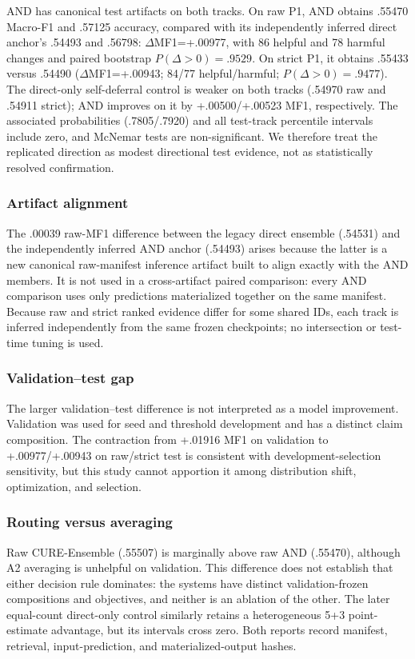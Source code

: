 \documentclass[11pt]{article}
\begin{document}
AND has canonical test artifacts on both tracks. On raw P1, AND obtains .55470 Macro-F1 and .57125 accuracy, compared with its independently inferred direct anchor's .54493 and .56798: $\Delta$MF1=+.00977, with 86 helpful and 78 harmful changes and paired bootstrap $P(\Delta>0)=.9529$. On strict P1, it obtains .55433 versus .54490 ($\Delta$MF1=+.00943; 84/77 helpful/harmful; $P(\Delta>0)=.9477$). The direct-only self-deferral control is weaker on both tracks (.54970 raw and .54911 strict); AND improves on it by +.00500/+.00523 MF1, respectively. The associated probabilities (.7805/.7920) and all test-track percentile intervals include zero, and McNemar tests are non-significant. We therefore treat the replicated direction as modest directional test evidence, not as statistically resolved confirmation.

\subsubsection{Artifact alignment}
The .00039 raw-MF1 difference between the legacy direct ensemble (.54531) and the independently inferred AND anchor (.54493) arises because the latter is a new canonical raw-manifest inference artifact built to align exactly with the AND members. It is not used in a cross-artifact paired comparison: every AND comparison uses only predictions materialized together on the same manifest. Because raw and strict ranked evidence differ for some shared IDs, each track is inferred independently from the same frozen checkpoints; no intersection or test-time tuning is used.

\subsubsection{Validation--test gap}
The larger validation--test difference is not interpreted as a model improvement. Validation was used for seed and threshold development and has a distinct claim composition. The contraction from +.01916 MF1 on validation to +.00977/+.00943 on raw/strict test is consistent with development-selection sensitivity, but this study cannot apportion it among distribution shift, optimization, and selection.

\subsubsection{Routing versus averaging}
Raw CURE-Ensemble (.55507) is marginally above raw AND (.55470), although A2 averaging is unhelpful on validation. This difference does not establish that either decision rule dominates: the systems have distinct validation-frozen compositions and objectives, and neither is an ablation of the other. The later equal-count direct-only control similarly retains a heterogeneous 5+3 point-estimate advantage, but its intervals cross zero. Both reports record manifest, retrieval, input-prediction, and materialized-output hashes.
\end{document}

